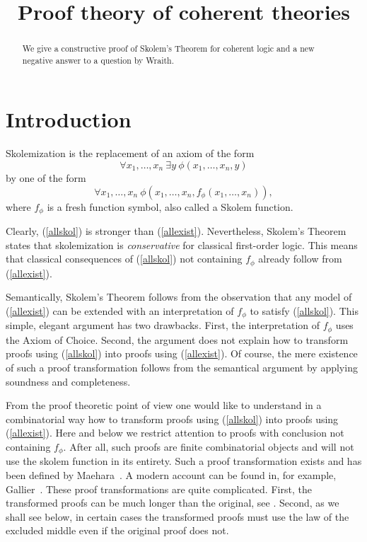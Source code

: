 \documentclass[10pt,a4paper]{article}
\newcommand{\many}[2]{{#1_1},\ldots,{#1_#2}}
\begin{document}
\title{Proof theory of coherent theories}

\author{}
\date{}
\maketitle

\begin{abstract}
We give a constructive proof of Skolem's Theorem for coherent logic
and a new negative answer to a question by Wraith.
\end{abstract}


\section*{Introduction}
Skolemization is the replacement of an axiom of the form
\begin{equation}\label{allexist}
\forall\many{x}{n}~\exists y~\phi(\many{x}{n},y)
\end{equation}
by one of the form
\begin{equation}\label{allskol}
\forall\many{x}{n}~\phi(\many{x}{n},f_\phi(\many{x}{n})),
\end{equation}
where $f_\phi$ is a fresh function symbol, also called a Skolem function.

Clearly, (\ref{allskol}) is stronger than (\ref{allexist}).
Nevertheless, Skolem's Theorem states that skolemization is \emph{conservative}
for classical first-order logic. This means that classical consequences of
(\ref{allskol}) not containing $f_\phi$ already follow from (\ref{allexist}).

Semantically, Skolem's Theorem follows from the observation that
any model of (\ref{allexist}) can be extended with an interpretation
of $f_\phi$ to satisfy (\ref{allskol}). This simple, elegant argument has two
drawbacks. First, the interpretation of $f_\phi$ uses the Axiom of Choice.
Second, the argument does not explain how to transform proofs using
(\ref{allskol}) into proofs using (\ref{allexist}).
Of course, the mere existence of such a proof transformation
follows from the semantical argument by applying soundness and completeness.

From the proof theoretic point of view one would like to understand
in a combinatorial way how to transform proofs using (\ref{allskol}) into proofs
using  (\ref{allexist}).  Here and below we restrict attention to
proofs with conclusion not containing $f_\phi$. After all, such proofs are finite
combinatorial objects and will not use the skolem function in its entirety.
Such a proof transformation exists and has been defined by Maehara~\cite{Maehara}. 
A modern account can be found in, for example, Gallier~\cite[Ch.~7]{Gallier}.
These proof transformations are quite complicated.
First, the transformed proofs can be much longer than the original, see \cite{xxx}.
Second, as we shall see below, in certain cases the transformed proofs must use
the law of the excluded middle even if the original proof does not.
\end{document}
